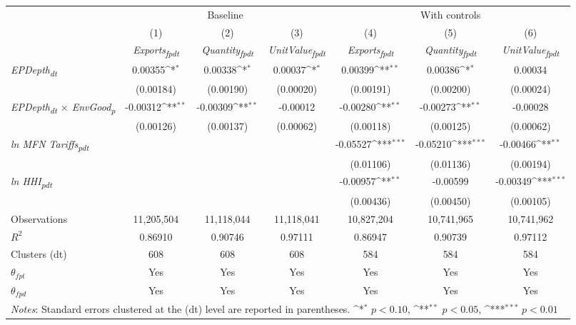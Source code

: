 {
\def\sym#1{\ifmmode^{#1}\else\(^{#1}\)\fi}
\begin{tabular}{l*{6}{c}}
\toprule
&\multicolumn{3}{c}{Baseline}&\multicolumn{3}{c}{With controls}\\\cmidrule(lr){2-4}\cmidrule(lr){5-7}
&(1)&(2)&(3)&(4)&(5)&(6)\\
&\textit{Exports\textsubscript{fpdt}}&\textit{Quantity\textsubscript{fpdt}}&\textit{UnitValue\textsubscript{fpdt}}&\textit{Exports\textsubscript{fpdt}}&\textit{Quantity\textsubscript{fpdt}}&\textit{UnitValue\textsubscript{fpdt}}\\
\midrule
\textit{EPDepth\textsubscript{dt}} & 0.00355\sym{*} & 0.00338\sym{*} & 0.00037\sym{*} & 0.00399\sym{**} & 0.00386\sym{*} & 0.00034\\
 & (0.00184) & (0.00190) & (0.00020) & (0.00191) & (0.00200) & (0.00024)\\
\addlinespace
\textit{EPDepth\textsubscript{dt} $\times$ EnvGood\textsubscript{p}} & -0.00312\sym{**} & -0.00309\sym{**} & -0.00012 & -0.00280\sym{**} & -0.00273\sym{**} & -0.00028\\
 & (0.00126) & (0.00137) & (0.00062) & (0.00118) & (0.00125) & (0.00062)\\
\addlinespace
\textit{ln MFN Tariffs\textsubscript{pdt}} &  &  &  & -0.05527\sym{***} & -0.05210\sym{***} & -0.00466\sym{**}\\
 &  &  &  & (0.01106) & (0.01136) & (0.00194)\\
\addlinespace
\textit{ln HHI\textsubscript{pdt}} &  &  &  & -0.00957\sym{**} & -0.00599 & -0.00349\sym{***}\\
 &  &  &  & (0.00436) & (0.00450) & (0.00105)\\
\midrule
Observations & 11,205,504 & 11,118,044 & 11,118,041 & 10,827,204 & 10,741,965 & 10,741,962\\
$R^{2}$ & 0.86910 & 0.90746 & 0.97111 & 0.86947 & 0.90739 & 0.97112\\
Clusters (dt) & 608 & 608 & 608 & 584 & 584 & 584\\
$\theta_{fpt}$ & Yes & Yes & Yes & Yes & Yes & Yes\\
$\theta_{fpd}$ & Yes & Yes & Yes & Yes & Yes & Yes\\
\bottomrule
\multicolumn{7}{l}{\footnotesize \textit{Notes}: Standard errors clustered at the (dt) level are reported in parentheses. \sym{*} \(p<0.10\), \sym{**} \(p<0.05\), \sym{***} \(p<0.01\)}\\
\end{tabular}
}
